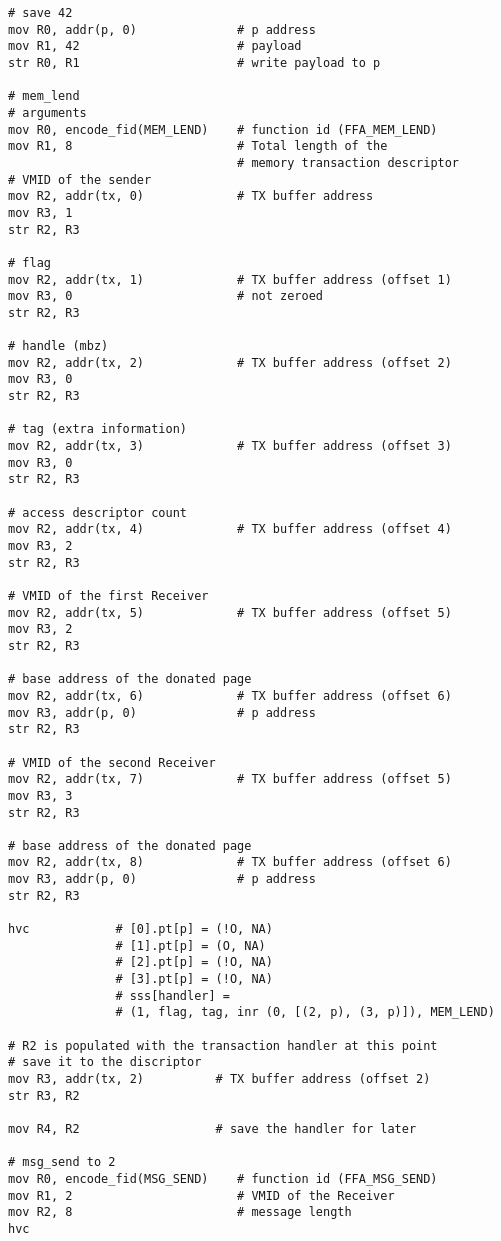 \documentclass{article}
\begin{document}
\begin{lstlisting}[caption={VM 1}]
# save 42
mov R0, addr(p, 0)              # p address
mov R1, 42                      # payload
str R0, R1                      # write payload to p

# mem_lend
# arguments
mov R0, encode_fid(MEM_LEND)    # function id (FFA_MEM_LEND)
mov R1, 8                       # Total length of the  
                                # memory transaction descriptor
# VMID of the sender 
mov R2, addr(tx, 0)             # TX buffer address                               
mov R3, 1
str R2, R3

# flag
mov R2, addr(tx, 1)             # TX buffer address (offset 1)                               
mov R3, 0                       # not zeroed
str R2, R3

# handle (mbz)
mov R2, addr(tx, 2)             # TX buffer address (offset 2)
mov R3, 0
str R2, R3

# tag (extra information)
mov R2, addr(tx, 3)             # TX buffer address (offset 3)
mov R3, 0
str R2, R3

# access descriptor count
mov R2, addr(tx, 4)             # TX buffer address (offset 4)
mov R3, 2
str R2, R3

# VMID of the first Receiver
mov R2, addr(tx, 5)             # TX buffer address (offset 5)
mov R3, 2
str R2, R3

# base address of the donated page
mov R2, addr(tx, 6)             # TX buffer address (offset 6)
mov R3, addr(p, 0)              # p address
str R2, R3

# VMID of the second Receiver
mov R2, addr(tx, 7)             # TX buffer address (offset 5)
mov R3, 3
str R2, R3

# base address of the donated page
mov R2, addr(tx, 8)             # TX buffer address (offset 6)
mov R3, addr(p, 0)              # p address
str R2, R3

hvc            # [0].pt[p] = (!O, NA)
               # [1].pt[p] = (O, NA)
               # [2].pt[p] = (!O, NA)
               # [3].pt[p] = (!O, NA)
               # sss[handler] = 
               # (1, flag, tag, inr (0, [(2, p), (3, p)]), MEM_LEND)

# R2 is populated with the transaction handler at this point
# save it to the discriptor
mov R3, addr(tx, 2)          # TX buffer address (offset 2)
str R3, R2

mov R4, R2                   # save the handler for later

# msg_send to 2
mov R0, encode_fid(MSG_SEND)    # function id (FFA_MSG_SEND)
mov R1, 2                       # VMID of the Receiver
mov R2, 8                       # message length
hvc


\end{lstlisting}
\end{document}
